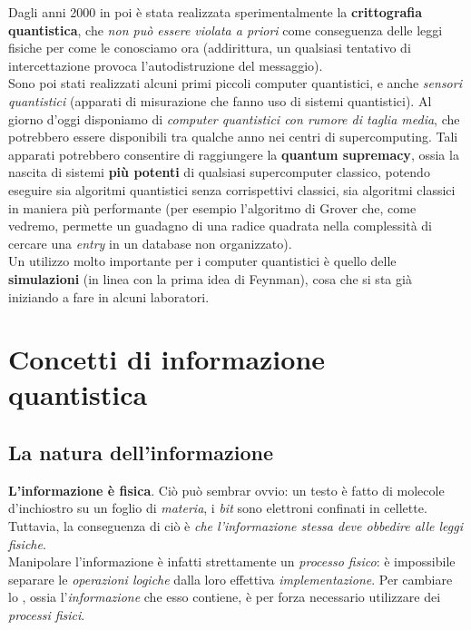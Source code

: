 \documentclass[../../InformazioneQuantistica.tex]{subfiles}
\begin{document}
Dagli anni 2000 in poi è stata realizzata sperimentalmente la \textbf{crittografia quantistica}, che \textit{non può essere violata a priori} come conseguenza delle leggi fisiche per come le conosciamo ora (addirittura, un qualsiasi tentativo di intercettazione provoca l'autodistruzione del messaggio).\\
Sono poi stati realizzati alcuni primi piccoli computer quantistici, e anche \textit{sensori quantistici} (apparati di misurazione che fanno uso di sistemi quantistici). Al giorno d'oggi disponiamo di \textit{computer quantistici con rumore di taglia media}, che potrebbero essere disponibili tra qualche anno nei centri di supercomputing. Tali apparati potrebbero consentire di raggiungere la \textbf{quantum supremacy}, ossia la nascita di sistemi \textbf{più potenti} di qualsiasi supercomputer classico, potendo eseguire sia algoritmi quantistici senza corrispettivi classici, sia algoritmi classici in maniera più performante (per esempio l'algoritmo di Grover che, come vedremo, permette un guadagno di una radice quadrata nella complessità di cercare una \textit{entry} in un database non organizzato).\\
Un utilizzo molto importante per i computer quantistici è quello delle \textbf{simulazioni} (in linea con la prima idea di Feynman), cosa che si sta già iniziando a fare in alcuni laboratori.

\section{Concetti di informazione quantistica}
\subsection{La natura dell'informazione}
\textbf{L'informazione è fisica}. Ciò può sembrar ovvio: un testo è fatto di molecole d'inchiostro su un foglio di \textit{materia}, i \textit{bit} sono elettroni confinati in cellette. Tuttavia, la conseguenza di ciò è \textit{che l'informazione stessa deve obbedire alle leggi fisiche}.\\ Manipolare l'informazione è infatti strettamente un \textit{processo fisico}: è impossibile separare le \textit{operazioni logiche} dalla loro effettiva \textit{implementazione}. Per cambiare lo , ossia l'\textit{informazione} che esso contiene, è per forza necessario utilizzare dei \textit{processi fisici}.\\
\end{document}
